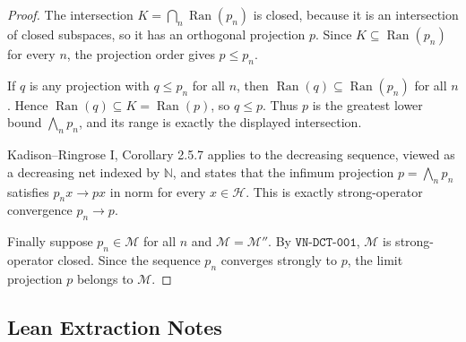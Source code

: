 \documentclass{article}
\newcommand{\cH}{\mathcal H}
\newcommand{\cM}{\mathcal M}
\begin{document}
\begin{proof}
The intersection \(K=\bigcap_n\operatorname{Ran}(p_n)\) is closed, because it
is an intersection of closed subspaces, so it has an orthogonal projection
\(p\).  Since \(K\subseteq\operatorname{Ran}(p_n)\) for every \(n\), the
projection order gives \(p\leq p_n\).

If \(q\) is any projection with \(q\leq p_n\) for all \(n\), then
\(\operatorname{Ran}(q)\subseteq\operatorname{Ran}(p_n)\) for all \(n\).
Hence \(\operatorname{Ran}(q)\subseteq K=\operatorname{Ran}(p)\), so
\(q\leq p\).  Thus \(p\) is the greatest lower bound
\(\bigwedge_n p_n\), and its range is exactly the displayed intersection.

Kadison--Ringrose I, Corollary 2.5.7 applies to the decreasing sequence,
viewed as a decreasing net indexed by \(\mathbb N\), and states that the
infimum projection \(p=\bigwedge_n p_n\) satisfies \(p_n x\to px\) in norm
for every \(x\in\cH\).  This is exactly strong-operator convergence
\(p_n\to p\).

Finally suppose \(p_n\in\cM\) for all \(n\) and \(\cM=\cM''\).  By
\(\texttt{VN-DCT-001}\), \(\cM\) is strong-operator closed.  Since the
sequence \(p_n\) converges strongly to \(p\), the limit projection \(p\)
belongs to \(\cM\).
\end{proof}

\subsection*{Lean Extraction Notes}
\end{document}
